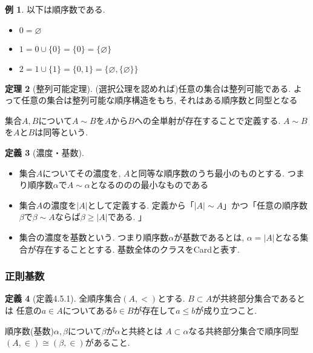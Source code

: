\documentclass[dvipdfmx,a4paper,11pt]{article}
\theoremstyle{definition}
\newtheorem{thm}{定理}
\newtheorem{dfn}[thm]{定義}
\newtheorem{exa}[thm]{例}
\begin{document}

\begin{exa}
以下は順序数である. 
\begin{itemize}
\item $0 = \varnothing$
\item $1 = 0 \cup \{ 0\} = \{ 0\} =\{ \varnothing\}$
\item $2 = 1 \cup \{1\} = \{0,1 \}= \{\varnothing, \{ \varnothing\}\}$
\end{itemize}
\end{exa}

 \begin{tcolorbox}
 [colback = white, colframe = green!35!black, fonttitle = \bfseries,breakable = true]
\begin{thm}[整列可能定理]
(選択公理を認めれば)任意の集合は整列可能である. 
よって任意の集合は整列可能な順序構造をもち, それはある順序数と同型となる
\end{thm}
\end{tcolorbox}

集合$A,B$について$A\sim B$を$A$から$B$への全単射が存在することで定義する. 
$A\sim B$を$A$と$B$は同等という.

 \begin{tcolorbox}
 [colback = white, colframe = green!35!black, fonttitle = \bfseries,breakable = true]
\begin{dfn}[濃度・基数]
\begin{itemize}
\item 集合$A$についてその濃度を, $A$と同等な順序数のうち最小のものとする. つまり順序数$\alpha$で$A \sim \alpha$となるののの最小なものである
\item 集合$A$の濃度を$|A|$として定義する. 定義から「$|A| \sim A$」かつ「任意の順序数$\beta$で$\beta \sim A$ならば$\beta \ge |A|$である. 」
\item 集合の濃度を基数という. つまり順序数$\alpha$が基数であるとは, $\alpha = |A|$となる集合が存在することとする. 基数全体のクラスをCardと表す.
\end{itemize}
\end{dfn}
\end{tcolorbox}

\subsubsection{正則基数}

\begin{tcolorbox}
 [colback = white, colframe = green!35!black, fonttitle = \bfseries,breakable = true]
\begin{dfn}[定義4.5.1]
全順序集合$(A,<)$とする. $B \subset A$が共終部分集合であるとは
任意の$a \in A$についてある$b \in B$が存在して$a\le b$が成り立つこと.

順序数(基数)$\alpha, \beta$について$\beta$が$\alpha$と共終とは
$A \subset \alpha$なる共終部分集合で順序同型$(A, \in) \cong (\beta, \in)$があること.
\end{dfn}
\end{tcolorbox}
\end{document}
